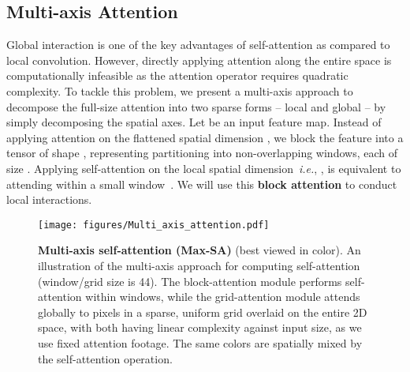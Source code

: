 \documentclass[runningheads]{llncs}
\begin{document}
\subsection{Multi-axis Attention}

Global interaction is one of the key advantages of self-attention as compared to local convolution.
However, directly applying attention along the entire space is computationally infeasible as the attention operator requires quadratic complexity.
To tackle this problem, we present a multi-axis approach to decompose the full-size attention into two sparse forms -- local and global -- by simply decomposing the spatial axes.
Let  be an input feature map. Instead of applying attention on the flattened spatial dimension , we {block} the feature into a tensor of shape , representing partitioning into non-overlapping windows, each of size .
Applying self-attention on the local spatial dimension~\emph{i.e.}, , is equivalent to attending within a small window~\cite{liu2021swin}.
We will use this \textbf{block attention} to conduct local interactions.

\begin{figure}[!t]
\centering
\texttt{[image: figures/Multi\_axis\_attention.pdf]}
\caption{\textbf{Multi-axis self-attention (Max-SA)} (best viewed in color). An illustration of the multi-axis approach for computing self-attention (window/grid size is 44). The block-attention module performs self-attention within windows, while the grid-attention module attends globally to pixels in a sparse, uniform grid overlaid on the entire 2D space, with both having linear complexity against input size, as we use fixed attention footage. The same colors are spatially mixed by the self-attention operation.}
\label{fig:MaxViT-block}
\end{figure}
\end{document}
